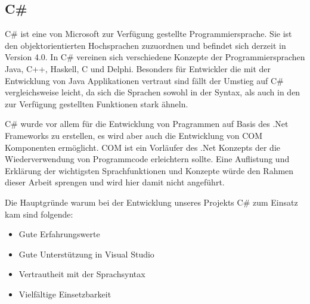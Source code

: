 \subsection{C\#}
C\# ist eine von Microsoft zur Verfügung gestellte Programmiersprache. Sie ist den objektorientierten Hochsprachen zuzuordnen und befindet sich derzeit in Version 4.0. In C\# vereinen sich verschiedene Konzepte der Programmiersprachen Java, C++, Haskell, C und Delphi. Besonders für Entwickler die mit der Entwicklung von Java Applikationen vertraut sind fällt der Umstieg auf C\# vergleichsweise leicht, da sich die Sprachen sowohl in der Syntax, als auch in den zur Verfügung gestellten Funktionen stark ähneln.

C\# wurde vor allem  für die Entwicklung von Pragrammen auf Basis des .Net Frameworks zu erstellen, es wird aber auch die Entwicklung von COM Komponenten ermöglicht. COM ist ein  Vorläufer des .Net Konzepts der die Wiederverwendung von Programmcode erleichtern sollte.
Eine Auflistung und Erklärung der wichtigsten Sprachfunktionen und Konzepte würde den Rahmen dieser Arbeit sprengen und wird hier damit nicht angeführt.

Die Hauptgründe warum bei der Entwicklung unseres Projekts C\# zum Einsatz kam sind folgende:
\begin{itemize}
\item Gute Erfahrungswerte\\

\item Gute Unterstützung in Visual Studio\\

\item Vertrautheit mit der Sprachsyntax\\

\item Vielfältige Einsetzbarkeit\\
\end{itemize}